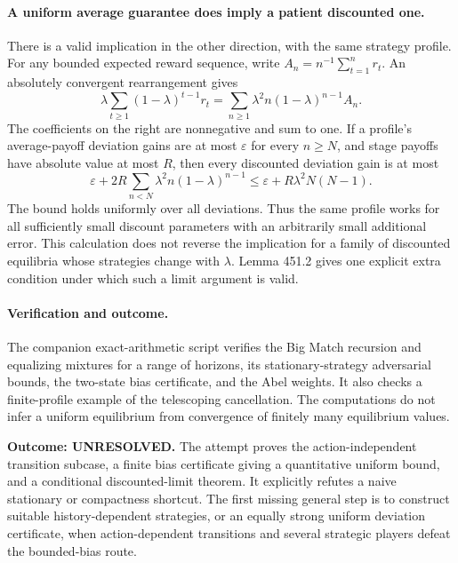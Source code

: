 \documentclass[11pt]{article}
\begin{document}
\paragraph{A uniform average guarantee does imply a patient discounted one.}
There is a valid implication in the other direction, with the same
strategy profile. For any bounded expected reward sequence, write
$A_n=n^{-1}\sum_{t=1}^n r_t$. An absolutely convergent rearrangement gives
\begin{equation}\label{a451:abel}
 \lambda\sum_{t\ge1}(1-\lambda)^{t-1}r_t
 =\sum_{n\ge1}\lambda^2n(1-\lambda)^{n-1}A_n.
\end{equation}
The coefficients on the right are nonnegative and sum to one. If a
profile's average-payoff deviation gains are at most $\varepsilon$
for every $n\ge N$, and stage payoffs have absolute value at most $R$,
then every discounted deviation gain is at most
\[
 \varepsilon+2R\sum_{n<N}\lambda^2n(1-\lambda)^{n-1}
 \le\varepsilon+R\lambda^2N(N-1).
\]
The bound holds uniformly over all deviations. Thus the same profile
works for all sufficiently small discount parameters with an arbitrarily
small additional error. This calculation does not reverse the implication
for a family of discounted equilibria whose strategies change with
$\lambda$. Lemma 451.2 gives one explicit extra condition under which
such a limit argument is valid.

\paragraph{Verification and outcome.}
The companion exact-arithmetic script verifies the Big Match recursion
and equalizing mixtures for a range of horizons, its stationary-strategy
adversarial bounds, the two-state bias certificate, and the Abel weights.
It also checks a finite-profile example of the telescoping cancellation.
The computations do not infer a uniform equilibrium from convergence
of finitely many equilibrium values.

\textbf{Outcome: UNRESOLVED.} The attempt proves the action-independent
transition subcase, a finite bias certificate giving a quantitative
uniform bound, and a conditional discounted-limit theorem. It explicitly
refutes a naive stationary or compactness shortcut. The first missing
general step is to construct suitable history-dependent strategies, or
an equally strong uniform deviation certificate, when action-dependent
transitions and several strategic players defeat the bounded-bias route.
\end{document}

